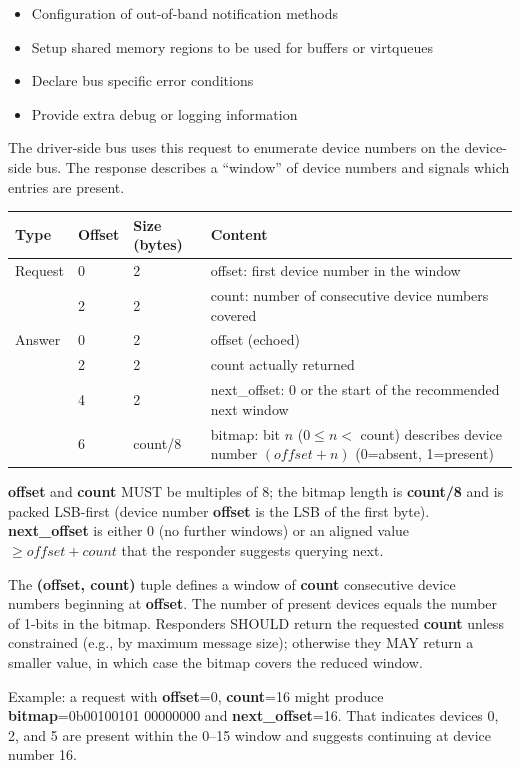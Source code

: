 \begin{itemize}
  \item Configuration of out-of-band notification methods
  \item Setup shared memory regions to be used for buffers or virtqueues
  \item Declare bus specific error conditions
  \item Provide extra debug or logging information
\end{itemize}


The driver-side bus uses this request to enumerate device numbers on the
device-side bus. The response describes a “window” of device numbers and signals
which entries are present.

\begin{tabular}{|l|l|l|l|}
\hline
Type & Offset & Size (bytes) & Content \\
\hline \hline
Request & 0 & 2 & offset: first device number in the window \\
        & 2 & 2 & count: number of consecutive device numbers covered \\
\hline
Answer  & 0 & 2 & offset (echoed) \\
        & 2 & 2 & count actually returned \\
        & 4 & 2 & next\_offset: 0 or the start of the recommended next window \\
        & 6 & count/8 & bitmap: bit $n$ ($0 \le n <$ count) describes device number $(offset + n)$ (0=absent, 1=present) \\
\hline
\end{tabular}

\textbf{offset} and \textbf{count} MUST be multiples of 8; the bitmap length is
\textbf{count/8} and is packed LSB-first (device number \textbf{offset} is the
LSB of the first byte).
\textbf{next_offset} is either 0 (no further windows) or an aligned value
$\ge offset + count$ that the responder suggests querying next.

The \textbf{(offset, count)} tuple defines a window of \textbf{count}
consecutive device numbers beginning at \textbf{offset}. The number of present
devices equals the number of 1-bits in the bitmap. Responders SHOULD return the
requested \textbf{count} unless constrained (e.g., by maximum message size);
otherwise they MAY return a smaller value, in which case the bitmap covers the
reduced window.

Example: a request with \textbf{offset}=0, \textbf{count}=16 might produce
\textbf{bitmap}=0b00100101 00000000 and \textbf{next_offset}=16. That indicates
devices 0, 2, and 5 are present within the 0–15 window and suggests continuing
at device number 16.

